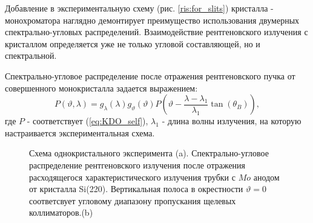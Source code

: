 \label{sec:single_crystal_section}

  Добавление в экспериментальную схему (рис. \ref{ris:for_slits}) кристалла - монохроматора
  наглядно демонтирует преимущество использования двумерных спектрально-угловых распределений.
Взаимодействие рентгеновского излучения с кристаллом определяется уже не только
угловой составляющей, но и спектральной.

  Спектрально-угловое распределение после отражения рентгеновского пучка от
  совершенного монокристалла задается выражением:
  \begin{equation} \label{eq:monochromator_spectra}
    P(\vartheta,\lambda) = g_{\lambda}(\lambda)g_{\vartheta}(\vartheta) P(\vartheta - \frac{\lambda - \lambda_1}{\lambda_1}\tan(\theta_B)),
   \end{equation}
где $P$ - соответствует (\ref{eq:KDO_self}), $\lambda_1$ - длина волны излучения, на которую
настраивается экспериментальная схема.

\begin{figure}[H]
  \centering
  \hfill

  \caption{Схема однокристального эксперимента (a). Спектрально-угловое распределение
  рентгеновского излучения после отражения расходящегося характеристического излучения
  трубки с $Mo$ анодом от кристалла Si(220). Вертикальная полоса в окрестности
  $\vartheta = 0$ соответсвует угловому диапазону пропускания щелевых коллиматоров.(b)}
  \label{ris:single_crystal_schem_lamtet}
\end{figure}

